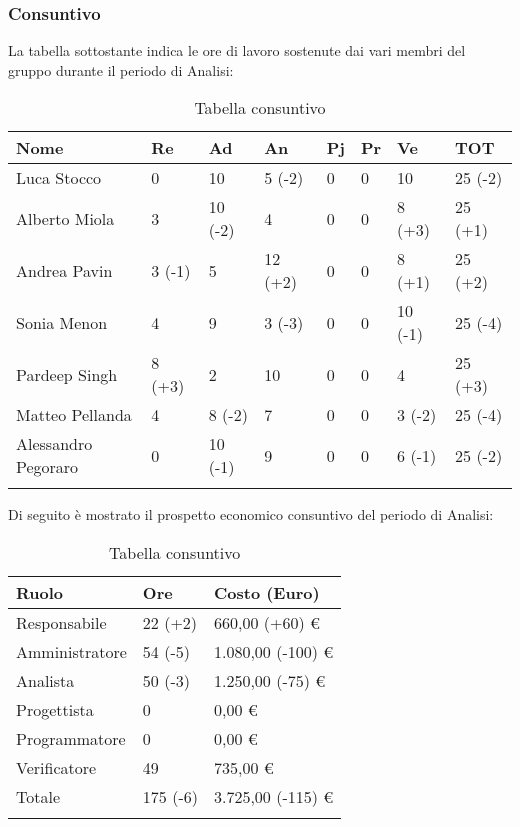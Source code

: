 \subsubsection{Consuntivo}
La tabella sottostante indica le ore di lavoro sostenute dai vari membri del gruppo durante il periodo di Analisi:
\begin{center}
	\renewcommand{\arraystretch}{1.5}
	\begin{longtable}[H]{ p{3.5cm}  p{1.2cm} p{1.2cm}  p{1.2cm} p{1.2cm}  p{1.2cm} p{1.2cm}  p{1.4cm}  }
		\rowcolor{tableHeadYellow}
		\textbf{Nome}   & \textbf{Re} & \textbf{Ad} & \textbf{An} & \textbf{Pj} & \textbf{Pr} & \textbf{Ve} & \textbf{TOT} \\ 
		\endhead
		Luca Stocco       & 0   	& 10    & 5 (-2) 	& 0   & 0   & 10 		& 25 (-2) \\  
		Alberto Miola     & 3   	& 10 (-2)  	& 4   	& 0   & 0   & 8 (+3) 	& 25 (+1) \\  
		Andrea Pavin      & 3 (-1) 	& 5  	& 12 (+2) 	& 0   & 0   & 8 (+1) 	& 25 (+2) \\  
		Sonia Menon       & 4  		& 9     & 3  (-3)	& 0   & 0   & 10 (-1)  	& 25 (-4) \\  
		Pardeep Singh     & 8 (+3)  & 2     & 10  		& 0   & 0   & 4  		& 25 (+3) \\  
		Matteo Pellanda   & 4   	& 8 (-2)   & 7   	& 0   & 0   & 3 (-2)	& 25 (-4) \\
		Alessandro Pegoraro	& 0		& 10 (-1)	& 9	  	& 0	  & 0	& 6	(-1)	& 25 (-2) \\
		\rowcolor{white}
		\caption{Tabella consuntivo}
	\end{longtable}
\end{center}
Di seguito è mostrato il prospetto economico consuntivo del periodo di Analisi:
\begin{center}
	\renewcommand{\arraystretch}{1.5}
	\begin{longtable}{  p{5.6cm}  p{3cm} p{3cm}  }
		\rowcolor{tableHeadYellow}
		\textbf{Ruolo}   & \textbf{Ore} & \textbf{Costo (Euro)} \\ 
		\endhead
		Responsabile   & 22 (+2)	& 660,00 (+60) \euro \\
		Amministratore & 54 (-5)	& 1.080,00 (-100) \euro \\
		Analista       & 50 (-3)	& 1.250,00 (-75) \euro\\
		Progettista    & 0    		& 0,00 \euro \\
		Programmatore  & 0    		& 0,00 \euro \\
		Verificatore   & 49 	  	& 735,00 \euro\\
		Totale         & 175 (-6)  	& 3.725,00 (-115) \euro \\
		\rowcolor{white}
		\caption{Tabella consuntivo}
	\end{longtable}
\end{center}
